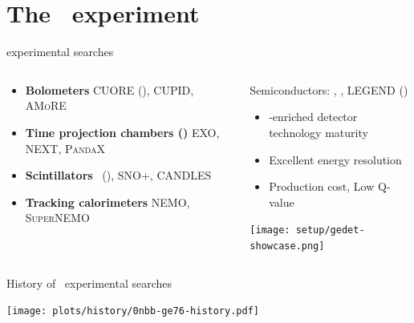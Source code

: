\documentclass[10pt,aspectratio=169]{beamer}
\newcommand{\cmark}{\textcolor{mLightGreen}{\ding{51}}}
\newcommand{\xmark}{\textcolor{mLightBrown}{\ding{55}}}
\begin{document}
\section{The \gerda\ experiment}
\begin{frame}{\texorpdfstring{\onbb}{0νββ} experimental searches}
  \begin{columns}
    \begin{column}{0.5\textwidth}
      \begin{itemize}
        \item \textbf{Bolometers} CUORE (), CUPID, \textsc{AMoRE}
        \item \textbf{Time projection chambers ()} EXO, NEXT, \textsc{PandaX}
        \item \textbf{Scintillators} \kamlandzen\ (), SNO+, CANDLES
        \item \textbf{Tracking calorimeters} NEMO, \textsc{SuperNEMO}
      \end{itemize}
    \end{column}
    \begin{column}{0.5\textwidth}
      \begin{alertblock}{Semiconductors: \gerda, \majoranademo, LEGEND (\gesix)}
        \begin{itemize}\small
          \item[\cmark] \gesix-enriched detector technology maturity
          \item[\cmark] Excellent energy resolution
          \item[\xmark] Production cost, Low Q-value
        \end{itemize}
      \end{alertblock}
      \begin{center}
        \texttt{[image: setup/gedet-showcase.png]}
      \end{center}
    \end{column}
  \end{columns}
\end{frame}
\begin{frame}{History of \gesix\ experimental \texorpdfstring{\onbb}{0νββ} searches}
  \begin{center}
    \texttt{[image: plots/history/0nbb-ge76-history.pdf]}
  \end{center}
\end{frame}
\end{document}
